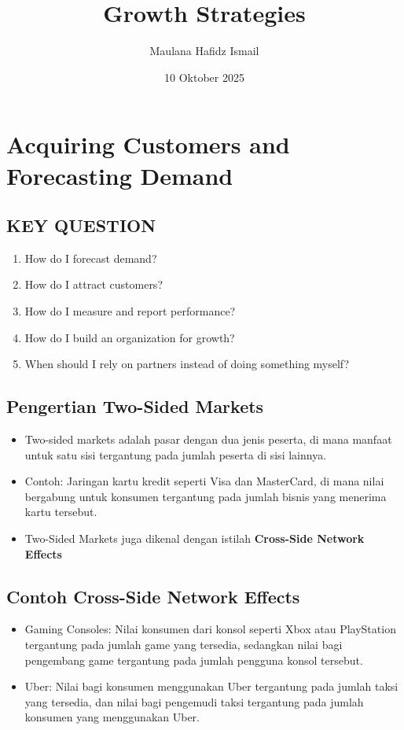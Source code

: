 \documentclass{article}
\title{Growth Strategies}
\date{10 Oktober 2025}
\author{Maulana Hafidz Ismail}
\begin{document}
\maketitle
\newpage

\tableofcontents
\newpage
{}

\section{Acquiring Customers and Forecasting Demand}
\subsection{KEY QUESTION}
\begin{enumerate}
    \item How do I forecast demand?
    \item How do I attract customers?
    \item How do I measure and report performance?
    \item  How do I build an organization for growth?
    \item  When should I rely on partners instead of doing something myself?
\end{enumerate}
\space

\subsection{Pengertian Two-Sided Markets}
\begin{itemize}
    \item Two-sided markets adalah pasar dengan dua jenis peserta, di mana manfaat untuk satu sisi tergantung pada jumlah peserta di sisi lainnya.
    \item Contoh: Jaringan kartu kredit seperti Visa dan MasterCard, di mana nilai bergabung untuk konsumen tergantung pada jumlah bisnis yang menerima kartu tersebut.
    \item Two-Sided Markets juga dikenal dengan istilah \textbf{Cross-Side Network Effects}
\end{itemize}

\subsection{Contoh Cross-Side Network Effects}
\begin{itemize}
    \item Gaming Consoles: Nilai konsumen dari konsol seperti Xbox atau PlayStation tergantung pada jumlah game yang tersedia, sedangkan nilai bagi pengembang game tergantung pada jumlah pengguna konsol tersebut.
    \item Uber: Nilai bagi konsumen menggunakan Uber tergantung pada jumlah taksi yang tersedia, dan nilai bagi pengemudi taksi tergantung pada jumlah konsumen yang menggunakan Uber.
\end{itemize}
\end{document}
